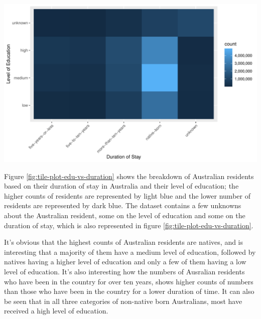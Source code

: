 \documentclass[11pt,a4paper,]{article}
\let\origfigure\figure
\let\endorigfigure\endfigure
\renewenvironment{figure}[1][2] {
    \expandafter\origfigure\expandafter[H]
} {
    \endorigfigure
}%
\begin{document}
\begin{figure}
\centering
\includegraphics{ETC5513assignment4_files/figure-latex/tile-plot-edu-vs-duration-1.pdf}
\caption{\label{fig:tile-plot-edu-vs-duration}Breakdown of Australian residents based on their level of Education and duration of stay in Australia}
\end{figure}

Figure \ref{fig:tile-plot-edu-vs-duration} shows the breakdown of Australian residents based on their duration of stay in Australia and their level of education; the higher counts of residents are represented by light blue and the lower number of residents are represented by dark blue. The dataset contains a few unknowns about the Australian resident, some on the level of education and some on the duration of stay, which is also represented in figure \ref{fig:tile-plot-edu-vs-duration}.

It's obvious that the highest counts of Australian residents are natives, and is interesting that a majority of them have a medium level of education, followed by natives having a higher level of education and only a few of them having a low level of education.
It's also interesting how the numbers of Ausralian residents who have been in the country for over ten years, shows higher counts of numbers than those who have been in the country for a lower duration of time. It can also be seen that in all three categories of non-native born Australians, most have received a high level of education.
\end{document}
